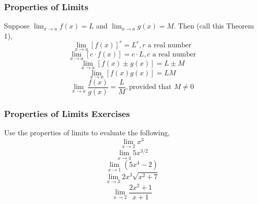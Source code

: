 \documentclass[xcolor=dvipsnames]{beamer}
\begin{document}
\begin{frame}
  \frametitle{Properties of Limits}
  Suppose $\lim_{x\rightarrow{}a}f(x)=L$ and
  $\lim_{x\rightarrow{}a}g(x)=M$. Then (call this \alert{Theorem 1}),
\begin{equation}
  \label{eq:johvoohu}
  \lim_{x\rightarrow{}a}[f(x)]^{r}=L^{r},r\mbox{ a real number}
\end{equation}
\begin{equation}
  \label{eq:eeyootoh}
  \lim_{x\rightarrow{}a}[c\cdot{}f(x)]=c\cdot{}L,c\mbox{ a real number}
\end{equation}
\begin{equation}
  \label{eq:kohzahwa}
  \lim_{x\rightarrow{}a}[f(x)\pm{}g(x)]=L\pm{}M
\end{equation}
\begin{equation}
  \label{eq:aekaqued}
  \lim_{x\rightarrow{}a}[f(x)g(x)]=LM
\end{equation}
\begin{equation}
  \label{eq:ahkeigae}
  \lim_{x\rightarrow{}a}\frac{f(x)}{g(x)}=\frac{L}{M},\mbox{provided that }M\neq{}0
\end{equation}
\end{frame}

\begin{frame}
  \frametitle{Properties of Limits Exercises}
Use the properties of limits to evaluate the following,
\begin{equation}
  \label{eq:eemoopha}
 \lim_{x\rightarrow{}2}x^{3} 
\end{equation}
\begin{equation}
  \label{eq:queebaet}
 \lim_{x\rightarrow{}4}5x^{3/2} 
\end{equation}
\begin{equation}
  \label{eq:xoquaenu}
 \lim_{x\rightarrow{}1}\left(5x^{4} -2\right)
\end{equation}
\begin{equation}
  \label{eq:othahzau}
 \lim_{x\rightarrow{}3}2x^{3}\sqrt{x^{2}+7}
\end{equation}
\begin{equation}
  \label{eq:ayaivoma}
 \lim_{x\rightarrow{}2}\frac{2x^{2}+1}{x+1}
\end{equation}
\end{frame}
\end{document}
